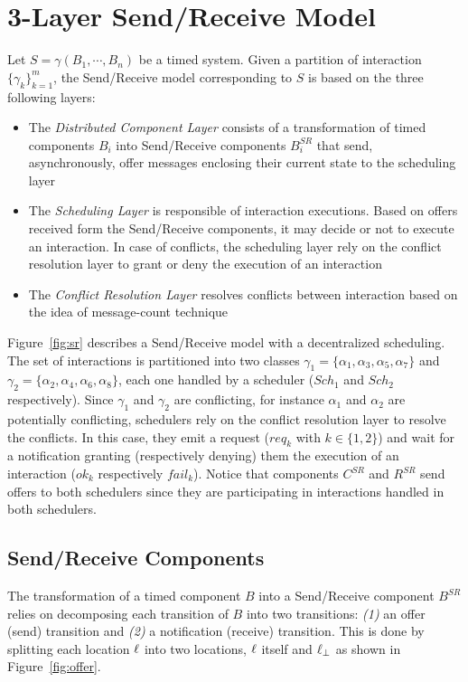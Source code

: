 \section{3-Layer Send/Receive Model}\label{sec:3.2}
Let $S=\gamma(B_1,\cdots,B_n)$ be a timed system. Given a partition of interaction
$\{\gamma_k\}^m_{k=1}$, the Send/Receive model corresponding to $S$ is based on the three
following layers:
\begin{itemize}
  \item The \emph{Distributed Component Layer} consists of a transformation of timed components
    $B_i$ into Send/Receive components $B_i^{SR}$ that send, asynchronously, offer messages 
    enclosing their current state to the scheduling layer 
  \item The \emph{Scheduling Layer} is responsible of interaction executions. Based on offers 
    received form the Send/Receive components, it may decide or not to execute an interaction.
    In case of conflicts, the scheduling layer rely on the conflict resolution layer to grant
    or deny the execution of an interaction
  \item The \emph{Conflict Resolution Layer} resolves conflicts between interaction based on
    the idea of message-count technique
\end{itemize}


\begin{example}
  Figure~\ref{fig:sr} describes a Send/Receive model with a decentralized scheduling. 
  The set of interactions is partitioned into two classes 
  $\gamma_1=\{\alpha_1,\alpha_3,\alpha_5,\alpha_7\}$ and
  $\gamma_2=\{\alpha_2,\alpha_4,\alpha_6,\alpha_8\}$, each one handled by a scheduler ($Sch_1$
  and $Sch_2$ respectively). Since $\gamma_1$ and $\gamma_2$ are conflicting, for instance
  $\alpha_1$ and $\alpha_2$ are potentially conflicting, schedulers rely on the conflict
  resolution layer to resolve the conflicts. In this case, they emit a request ($req_k$ with
  $k\in\{1,2\}$) and wait for a notification granting (respectively denying) them the execution
  of an interaction ($ok_k$ respectively $fail_k$).
  Notice that components $C^{SR}$ and $R^{SR}$ send offers to both schedulers since
  they are participating in interactions handled in both schedulers.
\end{example}
\subsection{Send/Receive Components}

The transformation of a timed component $B$ into a Send/Receive component $B^{SR}$ relies 
on decomposing each transition of $B$ into two transitions: \emph{(1)} an offer (send)
transition and \emph{(2)} a notification (receive) transition. This is done by splitting
each location $\ell$ into two locations, $\ell$ itself and $\ell_{\perp}$ as shown in 
Figure~\ref{fig:offer}.

